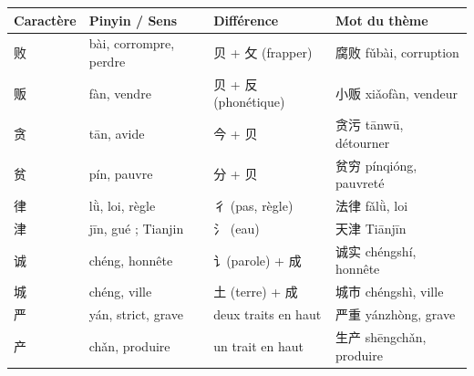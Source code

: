 \documentclass[11pt]{article}
\begin{document}
\begin{center}
\begin{tabularx}{\linewidth}{|X|X|X|X|}
\hline
\rowcolor{popblueL} Caractère & Pinyin / Sens & Différence & Mot du thème \\
\hline
败 & bài, corrompre, perdre & 贝 + 攵 (frapper) & 腐败 fǔbài, corruption \\
\hline
贩 & fàn, vendre & 贝 + 反 (phonétique) & 小贩 xiǎofàn, vendeur \\
\hline
贪 & tān, avide & 今 + 贝 & 贪污 tānwū, détourner \\
\hline
贫 & pín, pauvre & 分 + 贝 & 贫穷 pínqióng, pauvreté \\
\hline
律 & lǜ, loi, règle & 彳 (pas, règle) & 法律 fǎlǜ, loi \\
\hline
津 & jīn, gué ; Tianjin & 氵 (eau) & 天津 Tiānjīn \\
\hline
诚 & chéng, honnête & 讠(parole) + 成 & 诚实 chéngshí, honnête \\
\hline
城 & chéng, ville & 土 (terre) + 成 & 城市 chéngshì, ville \\
\hline
严 & yán, strict, grave & deux traits en haut & 严重 yánzhòng, grave \\
\hline
产 & chǎn, produire & un trait en haut & 生产 shēngchǎn, produire \\
\hline
\end{tabularx}
\end{center}
\end{document}

